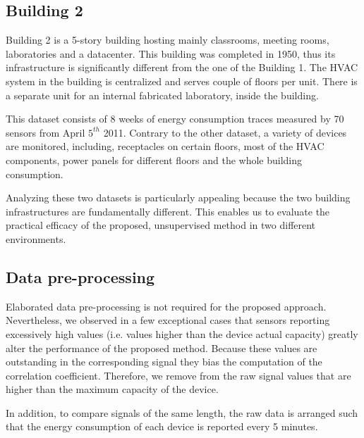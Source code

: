 
\subsection{Building 2}
Building 2 is a 5-story building hosting mainly classrooms, meeting rooms, laboratories and a datacenter.
This building was completed in 1950, thus its infrastructure is significantly different from the one of the Building 1.
The HVAC system in the building is centralized and serves couple of floors per unit.
There is a separate unit for an internal fabricated laboratory, inside the building.

This dataset consists of 8 weeks of energy consumption traces measured by 70 sensors from April $5^{th}$ 2011.
Contrary to the other dataset, a variety of devices are monitored, including, receptacles on certain floors, most of the HVAC components, 
 power panels for different floors and the whole building consumption.

Analyzing these two datasets is particularly appealing because the two building infrastructures are fundamentally different. 
This enables us to evaluate the practical efficacy of the proposed, unsupervised method in two different environments.


\subsection{Data pre-processing}
Elaborated data pre-processing is not required for the proposed approach.
Nevertheless, we observed in a few exceptional cases that sensors reporting excessively high values (i.e. values higher than the device actual capacity) greatly alter the performance of the proposed method.
Because these values are outstanding in the corresponding signal they bias the computation of the correlation coefficient.
Therefore, we remove from the raw signal values that are higher than the maximum capacity of the device.

In addition, to compare signals of the same length, the raw data is arranged such that the energy consumption of each device is reported every 5 minutes. 

